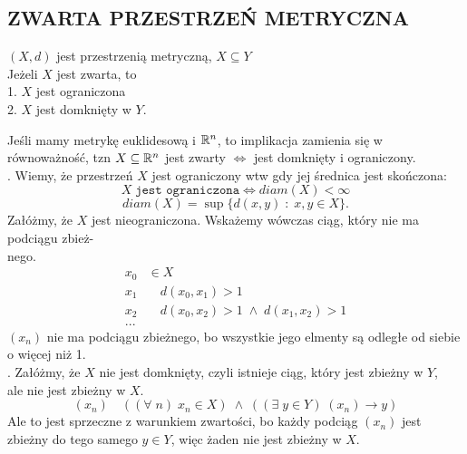 \subsection{ZWARTA PRZESTRZEŃ METRYCZNA}
\begin{center}\large
    $(X, d)$ jest przestrzenią metryczną, $X\subseteq Y$\smallskip\\
    {\color{def}Jeżeli $X$ jest zwarta, to}\medskip\\
    1. $X$ jest ograniczona\smallskip\\
    2. $X$ jest domknięty w $Y$.
\end{center}\bigskip
Jeśli mamy metrykę euklidesową i $\mathbb{R}^n$, to implikacja zamienia się w równoważność, tzn $X\subseteq \mathbb{R}^n$ jest zwarty $\iff$ jest domknięty i ograniczony.\bigskip\\
\dowod
{}. Wiemy, że przestrzeń $X$ jest ograniczony wtw gdy jej średnica jest skończona:
$$X\;\texttt{jest ograniczona}\iff diam(X)<\infty$$
$$diam(X) = \sup\{d(x,y)\;:\;x,y\in X\}.$$
Załóżmy, że $X$ jest nieograniczona. Wskażemy wówczas ciąg, który nie ma podciągu zbież-\\nego.
\begin{align*}
    x_0&\in X\\
    x_1&\quad d(x_0,x_1)>1\\
    x_2&\quad d(x_0, x_2)>1\;\land\;d(x_1, x_2)>1\\
    ...&
\end{align*}
$(x_n)$ nie ma podciągu zbieżnego, bo wszystkie jego elmenty są odległe od siebie o więcej niż 1.\bigskip\\
. Załóżmy, że $X$ nie jest domknięty, czyli istnieje ciąg, który jest zbieżny w $Y$, \\ale nie jest zbieżny w $X$. 
$$(x_n)\quad ((\forall\;n)\;x_n\in X)\;\land\;((\exists\;y\in Y)\;(x_n)\to y)$$
Ale to jest sprzeczne z warunkiem zwartości, bo każdy podciąg $(x_n)$ jest zbieżny do tego samego $y\in Y$, więc żaden nie jest zbieżny w $X$.
\kondow

